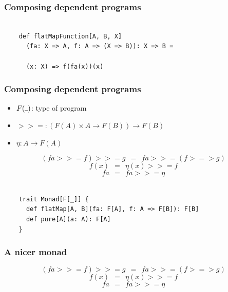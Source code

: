 \documentclass{beamer}
\newcommand{\gpause}{\vspace*{-\baselineskip}\pause}
\begin{document}
\begin{frame}[fragile]

  \frametitle{Composing dependent programs}

  \begin{verbatim}

    def flatMapFunction[A, B, X]
      (fa: X => A, f: A => (X => B)): X => B =

      (x: X) => f(fa(x))(x)

  \end{verbatim}

\end{frame}

\newcommand{\kcomp}{>\!=\!>}
\newcommand{\bind}{>\!\!>\!=}

\begin{frame}

  \frametitle{Composing dependent programs}
  \large

  \begin{itemize}
    \item $F(\rule{1ex}{.4pt})$: type of program \pause
    \item $\bind: (F(A) \times A \rightarrow F(B)) \rightarrow F(B)$ \pause
    \item $\eta: A \rightarrow F(A)$ \pause
  \end{itemize}

  $$(fa \bind f) \bind g \ \ = \ \ fa \bind (f \kcomp g)$$ \gpause
  $$f(x) \ \ = \ \ \eta(x) \bind f$$ \gpause
  $$fa \ \ = \ \ fa \bind \eta$$

\end{frame}

\begin{frame}[fragile]

  \begin{verbatim}

    trait Monad[F[_]] {
      def flatMap[A, B](fa: F[A], f: A => F[B]): F[B]
      def pure[A](a: A): F[A]
    }

  \end{verbatim}

\end{frame}

\begin{frame}

  \frametitle{A nicer monad}
  \large

  $$(fa \bind f) \bind g \ \ = \ \ fa \bind (f \kcomp g)$$
  $$f(x) \ \ = \ \ \eta(x) \bind f$$
  $$fa \ \ = \ \ fa \bind \eta$$

\end{frame}
\end{document}
